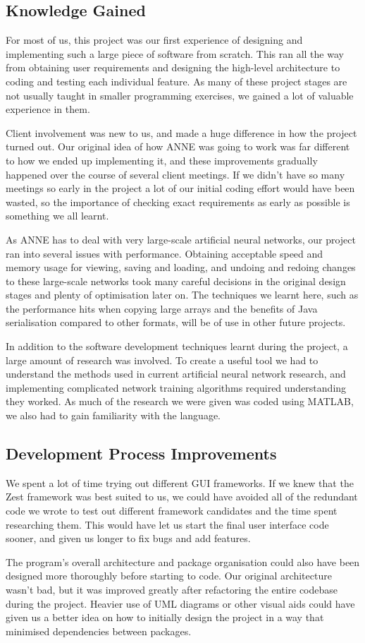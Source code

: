 \documentclass{acm_proc_article-sp}
\begin{document}
\subsection{Knowledge Gained}
{
For most of us, this project was our first experience of designing and implementing such a large piece of software from scratch. This ran all the way from obtaining user requirements and designing the high-level architecture to coding and testing each individual feature. As many of these project stages are not usually taught in smaller programming exercises, we gained a lot of valuable experience in them.

Client involvement was new to us, and made a huge difference in how the project turned out. Our original idea of how ANNE was going to work was far different to how we ended up implementing it, and these improvements gradually happened over the course of several client meetings. If we didn't have so many meetings so early in the project a lot of our initial coding effort would have been wasted, so the importance of checking exact requirements as early as possible is something we all learnt.

As ANNE has to deal with very large-scale artificial neural networks, our project ran into several issues with performance. Obtaining acceptable speed and memory usage for viewing, saving and loading, and undoing and redoing changes to these large-scale networks took many careful decisions in the original design stages and plenty of optimisation later on. The techniques we learnt here, such as the performance hits when copying large arrays and the benefits of Java serialisation compared to other formats, will be of use in other future projects.

In addition to the software development techniques learnt during the project, a large amount of research was involved. To create a useful tool we had to understand the methods used in current artificial neural network research, and implementing complicated network training algorithms required understanding they worked. As much of the research we were given was coded using MATLAB, we also had to gain familiarity with the language.
}
\newpage

\subsection{Development Process Improvements}
{
We spent a lot of time trying out different GUI frameworks. If we knew that the Zest framework was best suited to us, we could have avoided all of the redundant code we wrote to test out different framework candidates and the time spent researching them. This would have let us start the final user interface code sooner, and given us longer to fix bugs and add features.

The program's overall architecture and package organisation could also have been designed more thoroughly before starting to code. Our original architecture wasn't bad, but it was improved greatly after refactoring the entire codebase during the project. Heavier use of UML diagrams or other visual aids could have given us a better idea on how to initially design the project in a way that minimised dependencies between packages.
}
\end{document}

